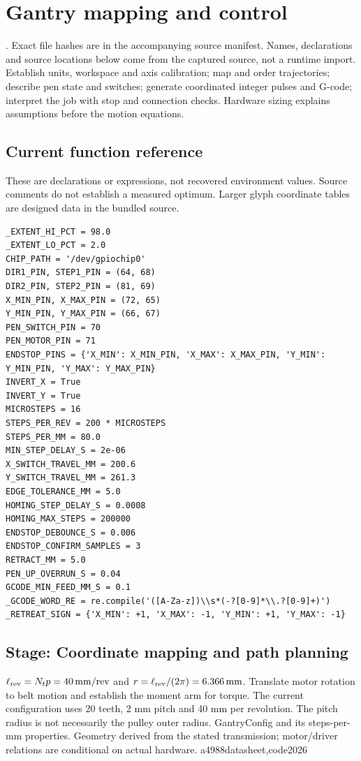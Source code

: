 \chapter{Gantry mapping and control}\label{module:reproduce}
. Exact file hashes are in the accompanying source manifest. Names, declarations and source locations below come from the captured source, not a runtime import.
Establish units, workspace and axis calibration; map and order trajectories; describe pen state and switches; generate coordinated integer pulses and G-code; interpret the job with stop and connection checks. Hardware sizing explains assumptions before the motion equations.



\section*{Current function reference}
These are declarations or expressions, not recovered environment values. Source comments do not establish a measured optimum. Larger glyph coordinate tables are designed data in the bundled source.
\begin{lstlisting}[style=plain]
_EXTENT_HI_PCT = 98.0
_EXTENT_LO_PCT = 2.0
CHIP_PATH = '/dev/gpiochip0'
DIR1_PIN, STEP1_PIN = (64, 68)
DIR2_PIN, STEP2_PIN = (81, 69)
X_MIN_PIN, X_MAX_PIN = (72, 65)
Y_MIN_PIN, Y_MAX_PIN = (66, 67)
PEN_SWITCH_PIN = 70
PEN_MOTOR_PIN = 71
ENDSTOP_PINS = {'X_MIN': X_MIN_PIN, 'X_MAX': X_MAX_PIN, 'Y_MIN': Y_MIN_PIN, 'Y_MAX': Y_MAX_PIN}
INVERT_X = True
INVERT_Y = True
MICROSTEPS = 16
STEPS_PER_REV = 200 * MICROSTEPS
STEPS_PER_MM = 80.0
MIN_STEP_DELAY_S = 2e-06
X_SWITCH_TRAVEL_MM = 200.6
Y_SWITCH_TRAVEL_MM = 261.3
EDGE_TOLERANCE_MM = 5.0
HOMING_STEP_DELAY_S = 0.0008
HOMING_MAX_STEPS = 200000
ENDSTOP_DEBOUNCE_S = 0.006
ENDSTOP_CONFIRM_SAMPLES = 3
RETRACT_MM = 5.0
PEN_UP_OVERRUN_S = 0.04
GCODE_MIN_FEED_MM_S = 0.1
_GCODE_WORD_RE = re.compile('([A-Za-z])\\s*(-?[0-9]*\\.?[0-9]+)')
_RETREAT_SIGN = {'X_MIN': +1, 'X_MAX': -1, 'Y_MIN': +1, 'Y_MAX': -1}
\end{lstlisting}
\section*{Stage: Coordinate mapping and path planning}
{$\ell_{\rm rev}=N_tp=40\,\mathrm{mm/rev}$ and
$r=\ell_{\rm rev}/(2\pi)=6.366\,\mathrm{mm}$.}
{Translate motor rotation to belt motion and establish the moment arm for torque.
The current configuration uses 20 teeth, 2 mm pitch and 40 mm per revolution.
The pitch radius is not necessarily the pulley outer radius.}
{GantryConfig and its steps-per-mm properties. Geometry derived from the stated
transmission; motor/driver relations are conditional on actual hardware.}
{a4988datasheet,code2026}

